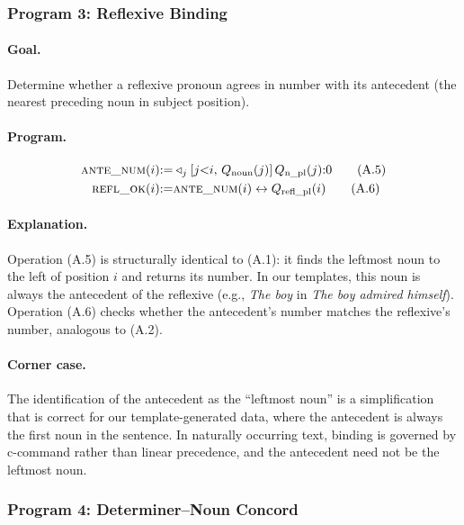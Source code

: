 \documentclass[11pt]{article}
\begin{document}
\subsubsection{Program 3: Reflexive Binding}
\label{app:prog-bind}

\paragraph{Goal.} Determine whether a reflexive pronoun agrees in number with its antecedent (the nearest preceding noun in subject position).

\paragraph{Program.}
\begin{align}
\textsc{ante\_num}(i) &{:=} \triangleleft_j[j{<}i,\, Q_\text{noun}(j)]\, Q_\text{n\_pl}(j) {:} 0 \tag{A.5} \\
\textsc{refl\_ok}(i) &{:=} \textsc{ante\_num}(i) \leftrightarrow Q_\text{refl\_pl}(i) \tag{A.6}
\end{align}

\paragraph{Explanation.}
Operation (A.5) is structurally identical to (A.1): it finds the leftmost noun to the left of position $i$ and returns its number.
In our templates, this noun is always the antecedent of the reflexive (e.g., \textit{The boy} in \textit{The boy admired himself}).
Operation (A.6) checks whether the antecedent's number matches the reflexive's number, analogous to (A.2).

\paragraph{Corner case.}
The identification of the antecedent as the ``leftmost noun'' is a simplification that is correct for our template-generated data, where the antecedent is always the first noun in the sentence.
In naturally occurring text, binding is governed by c-command rather than linear precedence, and the antecedent need not be the leftmost noun.

\subsubsection{Program 4: Determiner--Noun Concord}
\label{app:prog-conc}
\end{document}
